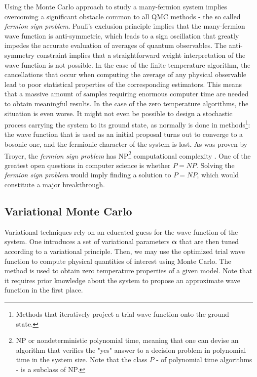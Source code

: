 Using the Monte Carlo approach to study a many-fermion system implies overcoming a significant obstacle common to all \ac{QMC} methods - the so called \emph{fermion sign problem}.
Pauli's exclusion principle implies that the many-fermion wave function is anti-symmetric, which leads to a sign oscillation that greatly impedes the accurate evaluation of averages of quantum observables.
The anti-symmetry constraint implies that a  straightforward weight interpretation of the wave function is not possible.
In the case of the finite temperature algorithm, the cancellations that occur when computing the average of any physical observable lead to poor statistical properties of the corresponding estimators.
This means that a massive amount of samples requiring enormous computer time are needed to obtain meaningful results.
In the case of the zero temperature algorithms, the situation is even worse.
It might not even be possible to design a stochastic process carrying the system to its ground state, as normally is done in  methods\footnote{Methods that iteratively project a trial wave function onto the ground state.}: the wave function that is used as an initial proposal turns out to converge to a bosonic one, and the fermionic character of the system is lost.
As was proven by Troyer, the \emph{fermion sign problem} has NP\footnote{NP or nondeterministic polynomial time, meaning that one can devise an algorithm that verifies the "yes" answer to a decision problem in polynomial time in the system size.
Note that the class $P$ - of polynomial time algorithms - is a subclass of NP.} computational complexity \cite{troyer_computational_2005}.
One of the greatest open questions in computer science is whether $P = NP$.
Solving the \emph{fermion sign problem} would imply finding a solution to $P = NP$, which would constitute a major breakthrough.

\subsection{Variational Monte Carlo}

Variational techniques rely on an educated guess for the wave function of the system.
One introduces a set of variational parameters $\bm \alpha$ that are then tuned according to a variational principle.
Then, we may use the optimized trial wave function to compute physical quantities of interest using Monte Carlo.
The method is used to obtain zero temperature properties of a given model.
Note that it requires prior knowledge about the system to propose an approximate wave function in the first place.

